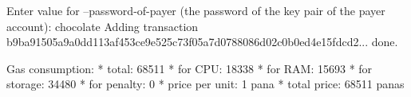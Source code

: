 \begin{shellbox}\begin{ttlst}
Enter value for --password-of-payer (the password of the key pair of the payer account): chocolate
Adding transaction b9ba91505a9a0dd113af453ce9e525c73f05a7d0788086d02c0b0ed4e15fdcd2... done.

Gas consumption:
 * total: 68511
   * for CPU: 18338
   * for RAM: 15693
   * for storage: 34480
   * for penalty: 0
 * price per unit: 1 pana
 * total price: 68511 panas
\end{ttlst}\end{shellbox}
